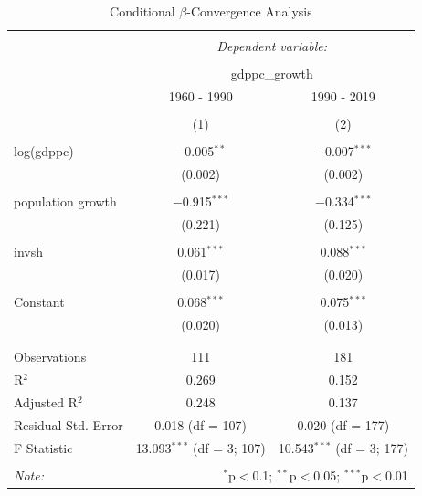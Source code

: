 \documentclass[a4paper,11pt]{article}
\begin{document}
\begin{table}[!htbp] \centering 
  \caption{Conditional $\beta$-Convergence Analysis} 
  \label{} 
\begin{tabular}{@{\extracolsep{5pt}}lcc} 
\\[-1.8ex]\hline 
\hline \\[-1.8ex] 
 & \multicolumn{2}{c}{\textit{Dependent variable:}} \\ 
\cline{2-3} 
\\[-1.8ex] & \multicolumn{2}{c}{gdppc\_growth} \\ 
 & 1960 - 1990 & 1990 - 2019 \\ 
\\[-1.8ex] & (1) & (2)\\ 
\hline \\[-1.8ex] 
 log(gdppc) & $-$0.005$^{**}$ & $-$0.007$^{***}$ \\ 
  & (0.002) & (0.002) \\ 
  & & \\ 
 population growth & $-$0.915$^{***}$ & $-$0.334$^{***}$ \\ 
  & (0.221) & (0.125) \\ 
  & & \\ 
 invsh & 0.061$^{***}$ & 0.088$^{***}$ \\ 
  & (0.017) & (0.020) \\ 
  & & \\ 
 Constant & 0.068$^{***}$ & 0.075$^{***}$ \\ 
  & (0.020) & (0.013) \\ 
  & & \\ 
\hline \\[-1.8ex] 
Observations & 111 & 181 \\ 
R$^{2}$ & 0.269 & 0.152 \\ 
Adjusted R$^{2}$ & 0.248 & 0.137 \\ 
Residual Std. Error & 0.018 (df = 107) & 0.020 (df = 177) \\ 
F Statistic & 13.093$^{***}$ (df = 3; 107) & 10.543$^{***}$ (df = 3; 177) \\ 
\hline 
\hline \\[-1.8ex] 
\textit{Note:}  & \multicolumn{2}{r}{$^{*}$p$<$0.1; $^{**}$p$<$0.05; $^{***}$p$<$0.01} \\ 
\end{tabular} 
\end{table}

\pagebreak
\end{document}
